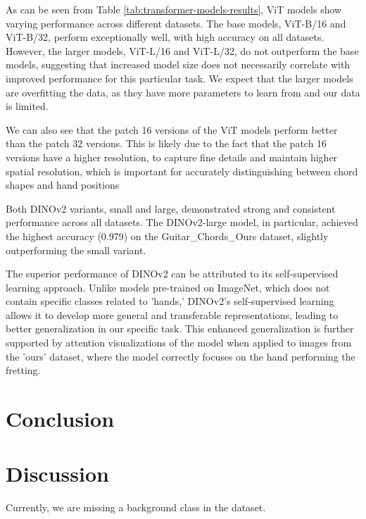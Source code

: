 \documentclass[10pt,twocolumn,letterpaper]{article}
\begin{document}
As can be seen from Table \ref{tab:transformer-models-results}, ViT models show varying performance across different datasets. The base models, ViT-B/16 and ViT-B/32, perform exceptionally well, with high accuracy on all datasets. However, the larger models, ViT-L/16 and ViT-L/32, do not outperform the base models, suggesting that increased model size does not necessarily correlate with improved performance for this particular task. We expect that the larger models are overfitting the data, as they have more parameters to learn from and our data is limited.

We can also see that the patch 16 versions of the ViT models perform better than the patch 32 versions. This is likely due to the fact that the patch 16 versions have a higher resolution, to capture fine details and maintain higher spatial resolution, which is important for accurately distinguishing between chord shapes and hand positions

Both DINOv2 variants, small and large, demonstrated strong and consistent performance across all datasets. The DINOv2-large model, in particular, achieved the highest accuracy (0.979) on the Guitar\_Chords\_Ours dataset, slightly outperforming the small variant.

The superior performance of DINOv2 can be attributed to its self-supervised learning approach. Unlike models pre-trained on ImageNet, which does not contain specific classes related to 'hands,' DINOv2's self-supervised learning allows it to develop more general and transferable representations, leading to better generalization in our specific task. This enhanced generalization is further supported by attention visualizations of the model when applied to images from the 'ours' dataset, where the model correctly focuses on the hand performing the fretting.

\section{Conclusion}

\section{Discussion}
Currently, we are missing a background class in the dataset.


 {\small
  
  
 }
\end{document}
